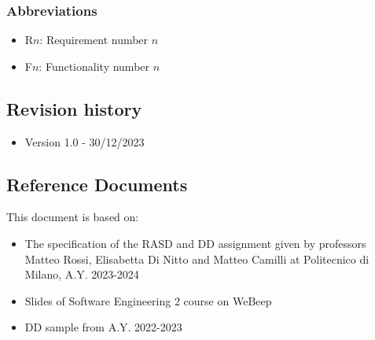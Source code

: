 \subsubsection{Abbreviations}
\begin{itemize}
    \item R$n$: Requirement number $n$
    \item F$n$: Functionality number $n$
\end{itemize}

\subsection{Revision history}
\begin{itemize}
    \item Version 1.0 - 30/12/2023
\end{itemize}


\subsection{Reference Documents}
This document is based on:
\begin{itemize}
    \item The specification of the RASD and DD assignment given by professors Matteo Rossi, Elisabetta Di Nitto and Matteo Camilli at Politecnico di Milano, A.Y. 2023-2024
    \item Slides of Software Engineering 2 course on WeBeep
    \item DD sample from A.Y. 2022-2023
\end{itemize}

